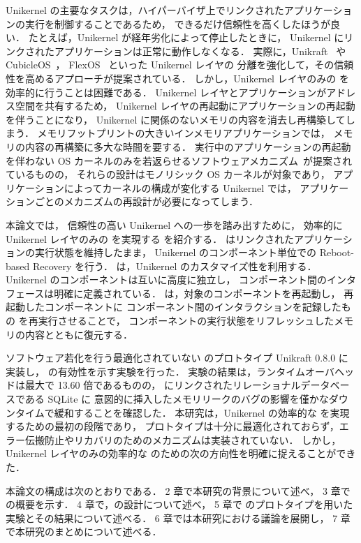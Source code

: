 Unikernel の主要なタスクは，ハイパーバイザ上でリンクされたアプリケーションの実行を制御することであるため，
できるだけ信頼性を高くしたほうが良い．
たとえば，Unikernel が経年劣化によって停止したときに，
Unikernel にリンクされたアプリケーションは正常に動作しなくなる．
実際に，Unikraft~\cite{KuenzerEtAl-Unikraft} や CubicleOS~\cite{SartakovEtAl-ASPLOS21}，
FlexOS~\cite{LefeuvreEtAl-FlexOS} といった Unikernel レイヤの
分離を強化して，その信頼性を高めるアプローチが提案されている．
しかし，Unikernel レイヤのみの \rr を効率的に行うことは困難である．
Unikernel レイヤとアプリケーションがアドレス空間を共有するため，
Unikernel レイヤの再起動にアプリケーションの再起動を伴うことになり，
Unikernel に関係のないメモリの内容を消去し再構築してしまう．
メモリフットプリントの大きいインメモリアプリケーションでは，
メモリの内容の再構築に多大な時間を要する．
実行中のアプリケーションの再起動を伴わない OS カーネルのみを若返らせるソフトウェアメカニズム~\cite{DepoutovitchEtAl-otherworld,TeradaEtAl-Dwarf}が提案されているものの，
それらの設計はモノリシック OS カーネルが対象であり，
アプリケーションによってカーネルの構成が変化する Unikernel では，
アプリケーションごとのメカニズムの再設計が必要になってしまう．

本論文では，
信頼性の高い Unikernel への一歩を踏み出すために，
効率的に Unikernel レイヤのみの \rr を実現する \emph{\sysname} を紹介する．
\sysname はリンクされたアプリケーションの実行状態を維持したまま，
Unikernel のコンポーネント単位での Reboot-based Recovery を行う．
\sysname は，Unikernel のカスタマイズ性を利用する．
Unikernel のコンポーネントは互いに高度に独立し，
コンポーネント間のインタフェースは明確に定義されている．
\sysname は，対象のコンポーネントを再起動し，
再起動したコンポーネントに
コンポーネント間のインタラクションを記録したもの
を再実行させることで，
コンポーネントの実行状態をリフレッシュしたメモリの内容とともに復元する．

ソフトウェア若化を行う最適化されていない \sysname のプロトタイプ Unikraft 0.8.0 に実装し，
\sysname の有効性を示す実験を行った．
実験の結果は，ランタイムオーバヘッドは最大で 13.60 倍であるものの，
\sysname にリンクされたリレーショナルデータベースである SQLite に
意図的に挿入したメモリリークのバグの影響を僅かなダウンタイムで緩和することを確認した．
本研究は，Unikernel の効率的な \rr を実現するための最初の段階であり，
プロトタイプは十分に最適化されておらず，エラー伝搬防止やリカバリのためのメカニズムは実装されていない．
しかし，Unikernel レイヤのみの効率的な \rr のための次の方向性を明確に捉えることができた．

本論文の構成は次のとおりである．
2 章で本研究の背景について述べ，
3 章で \sysname の概要を示す．
4 章で，\sysname の設計について述べ，
5 章で \sysname のプロトタイプを用いた実験とその結果について述べる．
6 章では本研究における議論を展開し，
7 章で本研究のまとめについて述べる．

